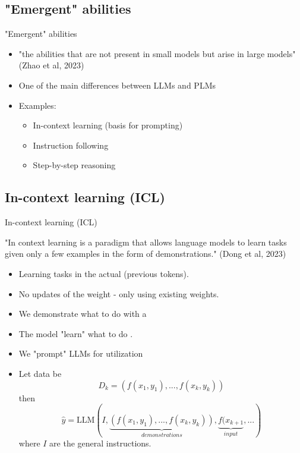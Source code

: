 \documentclass[10pt]{beamer}
\begin{document}

\subsection{"Emergent" abilities}

\begin{frame}{"Emergent" abilities}
\begin{itemize}
\item "the abilities that are not present in small models but arise in large models" (Zhao et al, 2023)
\item One of the main differences between LLMs and PLMs
\item Examples:
\begin{itemize}
\item In-context learning (basis for prompting)
\item Instruction following %
\item Step-by-step reasoning
\end{itemize}
\end{itemize}

\end{frame}

\subsection{In-context learning (ICL)}

\begin{frame}{In-context learning (ICL)}

"In context learning is a paradigm that allows language models to learn tasks given only a few examples in the form of demonstrations." (Dong et al, 2023)

\begin{itemize}
\item Learning tasks in the actual  (previous tokens).
\pause
\item No updates of the weight - only using existing weights.
\pause
\item We demonstrate what to do with a 
\pause
\item The model "learn" what to do .
\pause
\item We "prompt" LLMs for utilization
\item Let data be
\[
D_k = \left(f(x_1, y_1),...,f(x_k, y_k) \right)
\]
then
\[
\hat{y} = \text{LLM}(I, \underbrace{\left(f(x_1, y_1),...,f(x_k, y_k)\right)}_{demonstrations}, \underbrace{f(x_{k+1}}_{input} , ...)
\]
where $I$ are the general instructions.

\end{itemize}


\end{frame}
\end{document}
